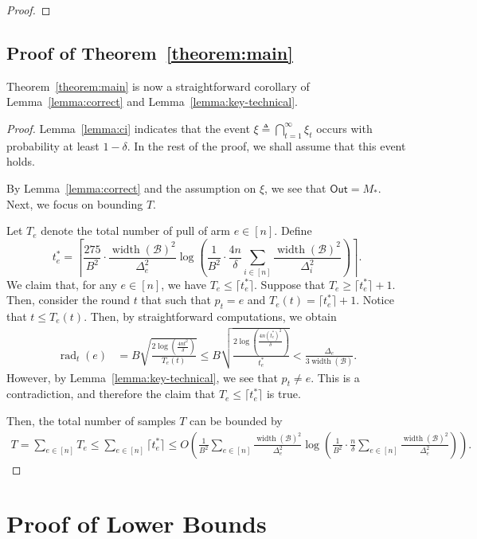 \documentclass{article}
\newcommand{\B}{\mathcal B}
\DeclareMathOperator{\rank}{width}
\DeclareMathOperator{\rad}{rad}
\newcommand{\out}{\mathsf{Out}}
\begin{document}
\begin{spacing}{1.1}
\begin{proof}
\end{proof}


\subsection{Proof of Theorem~\ref{theorem:main}}

Theorem~\ref{theorem:main} is now a straightforward corollary of Lemma~\ref{lemma:correct} and Lemma~\ref{lemma:key-technical}.
\begin{proof}
Lemma~\ref{lemma:ci} indicates that the event $\xi \triangleq \bigcap_{t=1}^\infty \xi_t$ occurs with probability at least $1-\delta$.
In the rest of the proof, we shall assume that this event holds.

By Lemma~\ref{lemma:correct} and the assumption on $\xi$, we see that $\out=M_*$.
Next, we focus on bounding $T$.


Let $T_e$ denote the total number of pull of arm $e\in [n]$.
Define 
$$
t_e^* = \left\lceil\frac{275}{B^2}\cdot\frac{\rank(\B)^2}{\Delta_e^2}\log\left(\frac{1}{B^2}\cdot\frac{4n}{\delta}\sum_{i\in[n]}\frac{\rank(\B)^2}{\Delta_i^2}\right)\right\rceil.
$$
We claim that, for any $e \in [n]$, we have $T_e \le \lceil t_e^* \rceil$.
Suppose that $T_e \ge \lceil t_e^* \rceil+1$.
Then, consider the round $t$ that such that $p_t=e$ and $T_e(t) =  \lceil t_e^* \rceil+1$.
Notice that $t \le T_e(t)$.
Then, by straightforward computations, we obtain
\begin{align*}
\rad_t(e) &=   B\sqrt{\frac{2\log\left(\frac{4n t^2}\delta\right)}{T_e(t)}} \le
 B\sqrt{\frac{2\log\left(\frac{4n (t_e^*)^2}\delta\right)}{t_e^*}} <  \frac{\Delta_e}{3\rank(\B)}. 	
\end{align*}
However, by Lemma~\ref{lemma:key-technical}, we see that $p_t\not=e$. This is a contradiction, and therefore the claim that $T_e \le \lceil t_e^* \rceil$ is true.

Then, the total number of samples $T$ can be bounded by
\begin{align*}
T = \sum_{e\in [n]} T_e \le \sum_{e\in [n]} \lceil t_e^* \rceil \le 
O\left(\frac{1}{B^2}\sum_{e\in [n]} \frac{\rank(\B)^2}{\Delta_e^2} \log\left(\frac{1}{B^2}\cdot \frac{n}{\delta} \sum_{e\in[n]}\frac{\rank(\B)^2}{\Delta_e^2} \right)\right).
\end{align*}

\end{proof}



\section{Proof of Lower Bounds}


\end{spacing}
\end{document}
